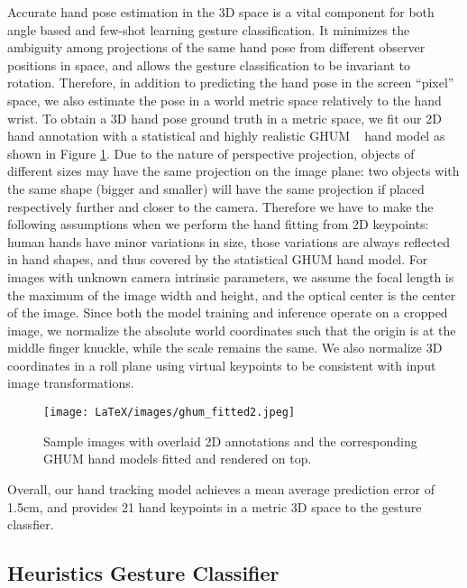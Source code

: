 \documentclass[10pt,twocolumn,letterpaper]{article}
\begin{document}
Accurate hand pose estimation in the 3D space is a vital component for both angle based and few-shot learning gesture classification. It minimizes the ambiguity among projections of the same hand pose from different observer positions in space, and allows the gesture classification to be invariant to rotation. Therefore, in addition to predicting the hand pose in the screen ``pixel'' space, we also estimate the pose in a world metric space relatively to the hand wrist. To obtain a 3D hand pose ground truth in a metric space, we fit our 2D hand annotation with a statistical and highly realistic GHUM ~\cite{xu2020ghum,zanfir2020weakly} hand model as shown in Figure \ref{fig:ghum}. Due to the nature of perspective projection, objects of different sizes may have the same projection on the image plane: two objects with the same shape (bigger and smaller) will have the same projection if placed respectively further and closer to the camera. Therefore we have to make the following assumptions when we perform the hand fitting from 2D keypoints: human hands have minor variations in size, those variations are always reflected in hand shapes, and thus covered by the statistical GHUM hand model. For images with unknown camera intrinsic parameters, we assume the focal length is the maximum of the image width and height, and the optical center is the center of the image. Since both the model training and inference operate on a cropped image, we normalize the absolute world coordinates such that the origin is at the middle finger knuckle, while the scale remains the same. We also normalize 3D coordinates in a roll plane using virtual keypoints to be consistent with input image transformations.
\begin{figure}
\begin{center}
   \texttt{[image: LaTeX/images/ghum\_fitted2.jpeg]}
\end{center}
   \caption{Sample images with overlaid 2D annotations and the corresponding GHUM \cite{xu2020ghum} hand models fitted and rendered on top.}
\label{fig:ghum}
\end{figure}

Overall, our hand tracking model achieves a mean average prediction error of 1.5cm, and provides 21 hand keypoints in a metric 3D space to the gesture classfier.

\subsection{Heuristics Gesture Classifier} \label{section:heuristic_gesture} 
\end{document}
